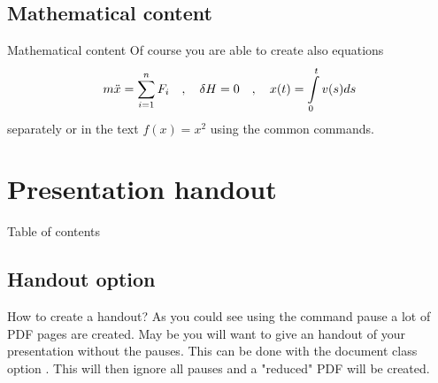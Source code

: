 \documentclass[handout]{beamer}
\begin{document}
\subsection[Math]{Mathematical content}
\begin{frame}{Mathematical content}
Of course you are able to create also equations
\begin{equation}
	m \ddot{x} = \sum_{i=1}^n F_i \quad , \quad
	\delta H = 0 \quad , \quad
	x(t) = \int_0^t\limits{ v(s) }ds
\end{equation}
separately or in the text $f(x)=x^2$ using the common commands.
\end{frame}


\section[Handout]{Presentation handout}

\begin{frame}{Table of contents}
\end{frame}


\subsection{Handout option}
\begin{frame}{How to create a handout?}
As you could see using the command pause a lot of PDF pages are created. May be you will want to give an handout of your presentation without the pauses. This can be done with the document class option . This will then ignore all pauses and a "reduced" PDF will be created.
\end{frame}

\end{document}

